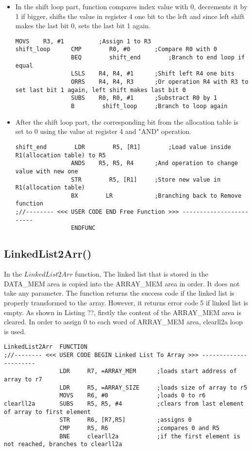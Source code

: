 \documentclass[pdftex,12pt,a4paper]{article}
\begin{document}
\begin{itemize}
    \item In the shift loop part, function compares index value with 0, decrements it by 1 if bigger, shifts the value in register 4 one bit to the left and since left shift makes the last bit 0, sets the last bit 1 again.
    \begin{lstlisting}[caption=shift\_loop, style=customasm]
                MOVS    R3, #1			;Assign 1 to R3
shift_loop      CMP        R0, #0		;Compare R0 with 0
                BEQ        shift_end		;Branch to end loop if equal
                LSLS    R4, R4, #1		;Shift left R4 one bits
                ORRS    R4, R4, R3		;Or operation R4 with R3 to set last bit 1 again, left shift makes last bit 0
                SUBS    R0, R0, #1		;Substract R0 by 1
                B        shift_loop		;Branch to loop again
    \end{lstlisting}
    
    \item After the shift loop part, the corresponding bit from the allocation table is set to 0 using the value at register 4 and "AND" operation.
    \begin{lstlisting}[caption=End of Free, style=customasm]
shift_end        LDR        R5, [R1]		;Load value inside R1(allocation table) to R5
                ANDS    R5, R5, R4		;And operation to change value with new one
                STR        R5, [R1]		;Store new value in R1(allocation table)
                BX        LR            ;Branching back to Remove function					
;//-------- <<< USER CODE END Free Function >>> ------------------------				
				ENDFUNC
    \end{lstlisting}
\end{itemize}

\subsection{LinkedList2Arr()}

In the $LinkedList2Arr$ function, The linked list that is stored in the DATA\_MEM area is copied into the ARRAY\_MEM area in order. It does not take any parameter. The function returns the success code if the linked list is properly transformed to the array. However, it returns error code 5 if linked list is empty. As shown in Listing ??, firstly the content of the ARRAY\_MEM area is cleared. In order to assign 0 to each word of ARRAY\_MEM area, clearll2a loop is used.

\begin{lstlisting}[caption=Clearing the ARRAY\_MEM area, style=customasm]
LinkedList2Arr	FUNCTION			
;//-------- <<< USER CODE BEGIN Linked List To Array >>> ----------------------			
				LDR 	R7, =ARRAY_MEM		;loads start address of array to r7
				LDR 	R5, =ARRAY_SIZE		;loads size of array to r5
				MOVS	R6, #0				;loads 0 to r6
clearll2a		SUBS	R5, R5, #4			;clears from last element of array to first element
				STR		R6, [R7,R5]			;assigns 0
				CMP		R5, R6				;compares 0 and R5
				BNE		clearll2a			;if the first element is not reached, branches to clearll2a
\end{lstlisting}
\end{document}
